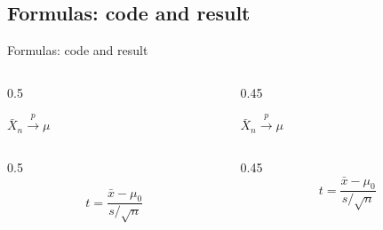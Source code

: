 \subsection{Formulas: code and result}
\begin{frame}{Formulas: code and result}
\begin{columns}[T,onlytextwidth]
\begin{column}{0.5\textwidth}
\begin{codeonly}
\begin{theorem}[Title]
  $\bar{X}_n \xrightarrow{p} \mu$
\end{theorem}
\end{codeonly}
\end{column}
\begin{column}{0.45\textwidth}
\stepoffset
\begin{theorem}
    $\bar{X}_n \xrightarrow{p} \mu$
\end{theorem}
\end{column}
\end{columns}
\bigskip
\begin{columns}[T,onlytextwidth]
\begin{column}{0.5\textwidth}
\begin{codeonly}
\[
  t=\frac{\bar{x}-\mu_0}{s/\sqrt{n}}
\]
\end{codeonly}
\end{column}
\begin{column}{0.45\textwidth}
\stepoffset
\[
  t=\frac{\bar{x}-\mu_0}{s/\sqrt{n}}
\]
\end{column}
\end{columns}
\end{frame}

